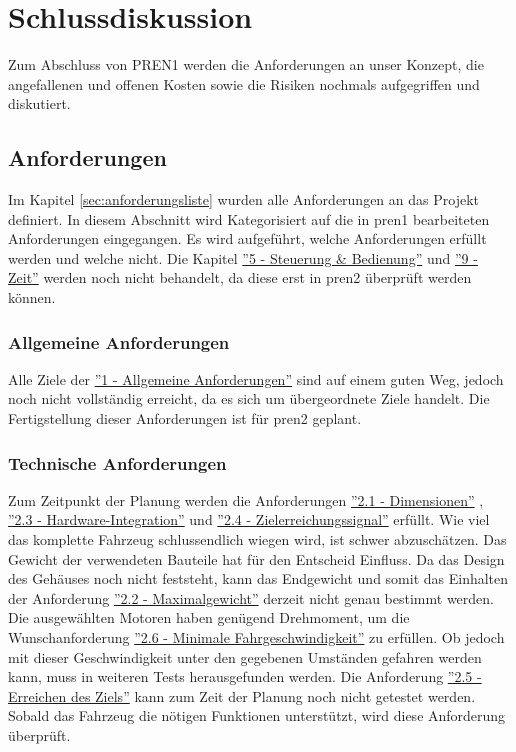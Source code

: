 \documentclass[../main.tex]{subfiles}
\begin{document}
\newpage
\section{Schlussdiskussion}

Zum Abschluss von PREN1 werden die Anforderungen an unser Konzept, die angefallenen und offenen Kosten sowie die Risiken nochmals aufgegriffen und diskutiert.

\subsection{Anforderungen}

Im Kapitel \ref{sec:anforderungsliste} wurden alle Anforderungen an das Projekt definiert.
In diesem Abschnitt wird Kategorisiert auf die in \acrshort{pren1}
bearbeiteten Anforderungen eingegangen. Es wird aufgeführt, welche Anforderungen erfüllt werden und welche nicht.
Die Kapitel \hyperlink{A5}{''5 - Steuerung \& Bedienung''} und \hyperlink{A9}{''9 - Zeit''} werden noch nicht behandelt, da diese erst in \acrshort{pren2} überprüft werden können.

\subsubsection{Allgemeine Anforderungen}
Alle Ziele der \hyperlink{A1}{''1 - Allgemeine Anforderungen''} sind auf einem guten Weg, jedoch noch nicht vollständig erreicht, da es sich um übergeordnete Ziele handelt. Die Fertigstellung dieser Anforderungen ist für \acrshort{pren2} geplant.

\subsubsection{Technische Anforderungen}
Zum Zeitpunkt der Planung werden die Anforderungen \hyperlink{A2.1}{''2.1 - Dimensionen''} , \hyperlink{A2.3}{''2.3 - Hardware-Integration''} und \hyperlink{A2.4}{''2.4 - Zielerreichungssignal''} erfüllt. Wie viel das komplette Fahrzeug schlussendlich wiegen wird, ist schwer abzuschätzen. Das Gewicht der verwendeten Bauteile hat für den Entscheid Einfluss. Da das Design des Gehäuses noch nicht feststeht, kann das Endgewicht und somit das Einhalten der Anforderung \hyperlink{A2.2}{''2.2 - Maximalgewicht''} derzeit nicht genau bestimmt werden. Die ausgewählten Motoren haben genügend Drehmoment, um die Wunschanforderung \hyperlink{A2.6}{''2.6 - Minimale Fahrgeschwindigkeit''} zu erfüllen. Ob jedoch mit dieser Geschwindigkeit unter den gegebenen Umständen gefahren werden kann, muss in weiteren Tests herausgefunden werden.
Die Anforderung \hyperlink{A2.5}{''2.5 - Erreichen des Ziels''} kann zum Zeit der Planung noch nicht getestet werden. Sobald das Fahrzeug die nötigen Funktionen unterstützt, wird diese Anforderung überprüft.
\end{document}
